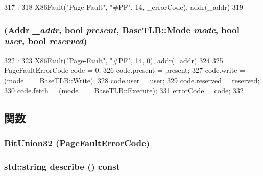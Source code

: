 \begin{DoxyCode}
317                                                    :
318             X86Fault("Page-Fault", "#PF", 14, _errorCode), addr(_addr)
319         {}

\end{DoxyCode}
\hypertarget{classX86ISA_1_1PageFault_aab0051d707e5450feb339851a04285e5}{
\subsubsection[{PageFault}]{ ({\bf Addr} {\em \_\-addr}, \/  bool {\em present}, \/  {\bf BaseTLB::Mode} {\em mode}, \/  bool {\em user}, \/  bool {\em reserved})}}
\label{classX86ISA_1_1PageFault_aab0051d707e5450feb339851a04285e5}



\begin{DoxyCode}
322                                           :
323             X86Fault("Page-Fault", "#PF", 14, 0), addr(_addr)
324         {
325             PageFaultErrorCode code = 0;
326             code.present = present;
327             code.write = (mode == BaseTLB::Write);
328             code.user = user;
329             code.reserved = reserved;
330             code.fetch = (mode == BaseTLB::Execute);
331             errorCode = code;
332         }

\end{DoxyCode}


\subsection{関数}
\hypertarget{classX86ISA_1_1PageFault_a8b746ff214278bd3ab8d35330ebbbf71}{
\subsubsection[{BitUnion32}]{\setlength{\rightskip}{0pt plus 5cm}BitUnion32 (PageFaultErrorCode)}}
\label{classX86ISA_1_1PageFault_a8b746ff214278bd3ab8d35330ebbbf71}
\hypertarget{classX86ISA_1_1PageFault_a1d7f1c12bd9a77eda766e6e8dca31e50}{
\subsubsection[{describe}]{\setlength{\rightskip}{0pt plus 5cm}std::string describe () const}}
\label{classX86ISA_1_1PageFault_a1d7f1c12bd9a77eda766e6e8dca31e50}


